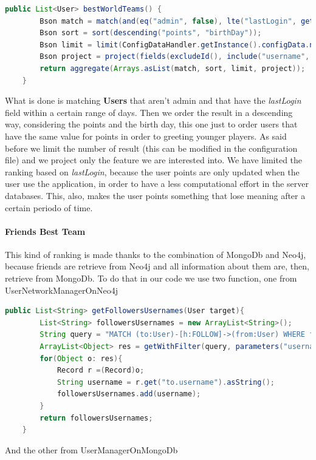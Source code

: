 \begin{lstlisting}[language=Java]
	public List<User> bestWorldTeams() {
		Bson match = match(and(eq("admin", false), lte("lastLogin", getDateThresholdForRanking())));
		Bson sort = sort(descending("points", "birthDay"));
		Bson limit = limit(ConfigDataHandler.getInstance().configData.numRowsRanking);
		Bson project = project(fields(excludeId(), include("username", "teamName", "points", "birthDay", "country")));
		return aggregate(Arrays.asList(match, sort, limit, project));
	}
\end{lstlisting}
What is done is matching \textbf{Users} that aren’t admin and that have the \textit{lastLogin} field within a certain range of days. Then we order the result in a descending way, considering the points and the birth day, this one just to order users that have the same value for points in order to greeting younger players. As said before we limit the number of result (this can be modified in the configuration file) and we project only the feature we are interested into.
We have limited the ranking based on \textit{lastLogin}, because the user points are only updated when the user use the application,  in order to have a less computational effort in the server databases. This, also, makes the user points something that lose meaning after a certain periodo of time.

\paragraph{Friends Best Team}
This kind of ranking is made thanks to the combination of MongoDb and Neo4j, because friends are retrieve from Neo4j and all information about them are, then, retrieve from MongoDb. To do that in our code we use two function, one from UserNetworkManagerOnNeo4j

\begin{lstlisting}[language=Java]
	public List<String> getFollowersUsernames(User target){
		List<String> followersUsernames = new ArrayList<String>();
		String query = "MATCH (to:User)-[h:FOLLOW]->(from:User) WHERE from.username = $username RETURN to.username";
		ArrayList<Object> res = getWithFilter(query, parameters("username", target.getUsername()));
		for(Object o: res){
			Record r =(Record)o;
			String username = r.get("to.username").asString();
			followersUsernames.add(username);
		}
		return followersUsernames;
	}
\end{lstlisting}

And the other from UserManagerOnMongoDb

